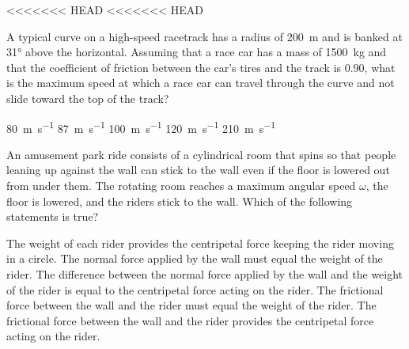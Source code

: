 \documentclass{../../oss-apphys-exam}
\begin{document}
\begin{multicols*}{2}
\begin{questions}
{{%
%
%
%     
<<<<<<< HEAD
<<<<<<< HEAD


    \question A typical curve on a high-speed racetrack has a radius of
    \SI{200}{\metre} and is banked at \ang{31} above the horizontal. Assuming
    that a race car has a mass of \SI{1500}{\kilo\gram} and that the
    coefficient of friction between the car's tires and the track is 0.90, what
    is the maximum speed at which a race car can travel through the curve and
    not slide toward the top of the track?
    \begin{choices}
      \choice\SI{80}{\metre\per\second}
      \choice\SI{87}{\metre\per\second}
      \choice\SI{100}{\metre\per\second}
      \choice\SI{120}{\metre\per\second}
      \choice\SI{210}{\metre\per\second}
    \end{choices}
    
    
    \question An amusement park ride consists of a cylindrical room that spins
    so that people leaning up against the wall can stick to the wall even if the
    floor is lowered out from under them. The rotating room reaches a maximum
    angular speed $\omega$, the floor is lowered, and the riders stick to
    the wall. Which of the following statements is true?
    \begin{choices}
      \choice The weight of each rider provides the centripetal force keeping
      the rider moving in a circle.
      \choice The normal force applied by the wall must equal the weight of the
      rider.
      \choice The difference between the normal force applied by the wall and
      the weight of the rider is equal to the centripetal force acting on the
      rider.
      \choice The frictional force between the wall and the rider must equal the
      weight of the rider.
      \choice The frictional force between the wall and the rider provides the
      centripetal force acting on the rider.
    \end{choices}
    \columnbreak

}}
\end{questions}
\end{multicols*}
\end{document}
